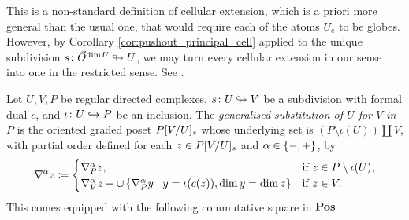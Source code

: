 \begin{comm}  \label{comm:def_cellular_extension}
    This is a non-standard definition of cellular extension, which is a priori more general than the usual one, that would require each of the atoms \( U_e \) to be globes.
    However, by Corollary \ref{cor:pushout_principal_cell} applied to the unique subdivision \( s \colon \vec{O}^{{\dim U}} \looparrowright U \), we may turn every cellular extension in our sense into one in the restricted sense. 
    See \cite[Comment 8.2.2]{hadzihasanovic2024combinatorics}. 
\end{comm}

\begin{dfn} 
    Let \( U, V, P \) be regular directed complexes, \( s \colon U \looparrowright V \) be a subdivision with formal dual \( c \), and \( \iota \colon U \hookrightarrow P \) be an inclusion.
    The \emph{generalised substitution of \( U \) for \( V \) in \( P \)} is the oriented graded poset \( P[V/U]_s \) whose underlying set is \( (P \setminus \iota(U)) \coprod V \), with partial order defined for each \( z \in P[V/U]_s  \) and \( \alpha \in \left\{ {-, +} \right\} \), by
    \begin{equation*}
        \nabla_{}^{\alpha} z \coloneqq 
        \begin{cases}
            \nabla_{P}^{\alpha} z, & \text{if } z \in P \setminus \iota(U), \\
            \nabla_{V}^{\alpha} z + \cup \left\{ {\nabla_{P}^{\alpha} y \mid y = \iota(c(z)), \dim y = \dim z} \right\} & \text{if } z \in V.
        \end{cases}
    \end{equation*}
    This comes equipped with the following commutative square in \( \mathbf{Pos} \)
    \begin{center}
    \end{center}
\end{dfn}

